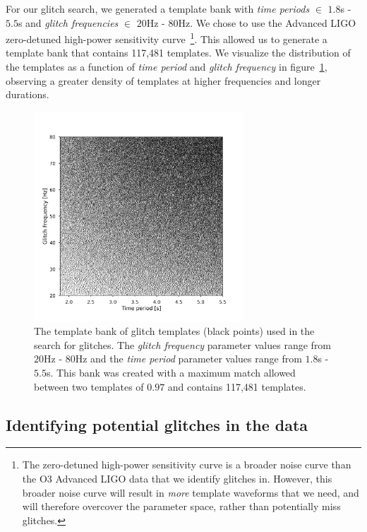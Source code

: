 For our \scl{} glitch search, we generated a template bank with \emph{time periods} $\in$ $1.8$s - $5.5$s and \emph{glitch frequencies} $\in$ $20$Hz - $80$Hz. We chose to use the Advanced LIGO zero-detuned high-power sensitivity curve~\cite{SensCurve}\footnote{The zero-detuned high-power sensitivity curve is a broader noise curve than the O3 Advanced LIGO data that we identify \scl{} glitches in. However, this broader noise curve will result in \emph{more} template waveforms that we need, and will therefore overcover the parameter space, rather than potentially miss \scl{} glitches.}. This allowed us to generate a template bank that contains 117,481 templates. We visualize the distribution of the templates as a function of \emph{time period} and \emph{glitch frequency} in figure~\ref{fig:sq_bank}, observing a greater density of templates at higher frequencies and longer durations.

\begin{figure}
  \centering
  \includegraphics[width=0.7\textwidth]{images/archenemy/Section3/3.2/template_bank_square.pdf}
  \caption{The template bank of \scl{} glitch templates (black points) used in the search for \scl{} glitches. The \emph{glitch frequency} parameter values range from $20$Hz - $80$Hz and the \emph{time period} parameter values range from $1.8$s - $5.5$s. This bank was created with a maximum match allowed between two templates of $0.97$ and contains 117,481 templates.}
  \label{fig:sq_bank}
\end{figure}

\subsection{Identifying potential \scl{} glitches in the data}

